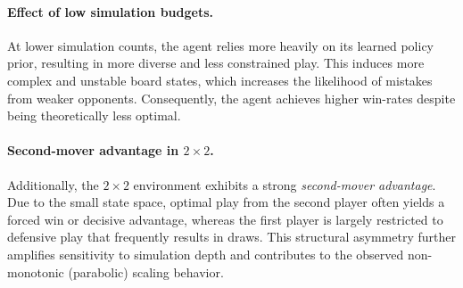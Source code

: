 \documentclass[11pt]{article}
\begin{document}
\paragraph{Effect of low simulation budgets.}
At lower simulation counts, the agent relies more heavily on its learned policy prior, resulting in more diverse and less constrained play. This induces more complex and unstable board states, which increases the likelihood of mistakes from weaker opponents. Consequently, the agent achieves higher win-rates despite being theoretically less optimal.

\paragraph{Second-mover advantage in $2{\times}2$.}
Additionally, the $2{\times}2$ environment exhibits a strong \emph{second-mover advantage}. Due to the small state space, optimal play from the second player often yields a forced win or decisive advantage, whereas the first player is largely restricted to defensive play that frequently results in draws. This structural asymmetry further amplifies sensitivity to simulation depth and contributes to the observed non-monotonic (parabolic) scaling behavior.
\end{document}
